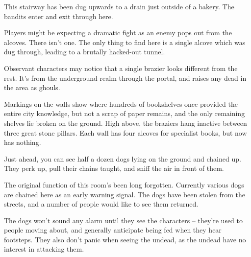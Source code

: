 \label{sewer_map}

\begin{multicols}{2}

\label{bakery_exit}

This stairway has been dug upwards to a drain just outside of a bakery.  The bandits enter and exit through here.

\label{oldlibrary}

Players might be expecting a dramatic fight as an enemy pops out from the alcoves.  There isn't one.  The only thing to find here is a single alcove which was dug through, leading to a brutally hacked-out tunnel.

Observant characters may notice that a single brazier looks different from the rest.  It's from the underground realm through the portal, and raises any dead in the area as ghouls.

\begin{boxtext}

	Markings on the walls show where hundreds of bookshelves once provided the entire city knowledge, but not a scrap of paper remains, and the only remaining shelves lie broken on the ground.  High above, the braziers hang inactive between three great stone pillars.  Each wall has four alcoves for specialist books, but now has nothing.

\end{boxtext}



\begin{boxtext}

	Just ahead, you can see half a dozen dogs lying on the ground and chained up.  They perk up, pull their chains taught, and sniff the air in front of them.

\end{boxtext}

The original function of this room's been long forgotten.  Currently various dogs are chained here as an early warning signal.  The dogs have been stolen from the streets, and a number of people would like to see them returned.

The dogs won't sound any alarm until they see the characters -- they're used to people moving about, and generally anticipate being fed when they hear footsteps.  They also don't panic when seeing the undead, as the undead have no interest in attacking them.


\end{multicols}
